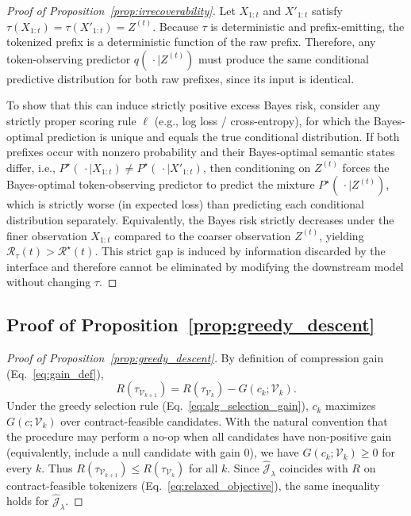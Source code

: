 \begin{proof}[Proof of Proposition~\ref{prop:irrecoverability}]
Let $X_{1:t}$ and $X'_{1:t}$ satisfy $\tau(X_{1:t})=\tau(X'_{1:t})=Z^{(t)}$.
Because $\tau$ is deterministic and prefix-emitting, the tokenized prefix is a deterministic function of the raw prefix.
Therefore, any token-observing predictor $q(\,\cdot \mid Z^{(t)})$ must produce the same conditional predictive distribution for both raw prefixes, since its input is identical.

To show that this can induce strictly positive excess Bayes risk, consider any strictly proper scoring rule $\ell$ (e.g., log loss / cross-entropy), for which the Bayes-optimal prediction is unique and equals the true conditional distribution.
If both prefixes occur with nonzero probability and their Bayes-optimal semantic states differ, i.e.,
$P^\star(\,\cdot \mid X_{1:t}) \neq P^\star(\,\cdot \mid X'_{1:t})$,
then conditioning on $Z^{(t)}$ forces the Bayes-optimal token-observing predictor to predict the mixture
$P^\star(\,\cdot \mid Z^{(t)})$, which is strictly worse (in expected loss) than predicting each conditional distribution separately.
Equivalently, the Bayes risk strictly decreases under the finer observation $X_{1:t}$ compared to the coarser observation $Z^{(t)}$, yielding
$\mathcal{R}_\tau(t) > \mathcal{R}^\star(t)$.
This strict gap is induced by information discarded by the interface and therefore cannot be eliminated by modifying the downstream model without changing $\tau$.
\end{proof}

\subsection{Proof of Proposition~\ref{prop:greedy_descent}}
\label{app:proof_greedy_descent}

\begin{proof}[Proof of Proposition~\ref{prop:greedy_descent}]
By definition of compression gain (Eq.~\eqref{eq:gain_def}),
\[
R(\tau_{\mathcal{V}_{k+1}})
=
R(\tau_{\mathcal{V}_k}) - G(c_k;\mathcal{V}_k).
\]
Under the greedy selection rule (Eq.~\eqref{eq:alg_selection_gain}), $c_k$ maximizes $G(c;\mathcal{V}_k)$ over
contract-feasible candidates.
With the natural convention that the procedure may perform a no-op when all candidates have non-positive gain (equivalently, include a null candidate with gain $0$), we have $G(c_k;\mathcal{V}_k)\ge 0$ for every $k$.
Thus $R(\tau_{\mathcal{V}_{k+1}})\le R(\tau_{\mathcal{V}_k})$ for all $k$.
Since $\widehat{\mathcal{J}}_\lambda$ coincides with $R$ on contract-feasible tokenizers (Eq.~\eqref{eq:relaxed_objective}), the same inequality holds for $\widehat{\mathcal{J}}_\lambda$.
\end{proof}
